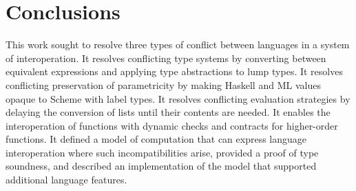 \chapter{Conclusions}

This work sought to resolve three types of conflict between languages in a system of interoperation.  It resolves conflicting type systems by converting between equivalent expressions and applying type abstractions to lump types.  It resolves conflicting preservation of parametricity by making Haskell and ML values opaque to Scheme with label types.  It resolves conflicting evaluation strategies by delaying the conversion of lists until their contents are needed.  It enables the interoperation of functions with dynamic checks and contracts for higher-order functions.  It defined a model of computation that can express language interoperation where such incompatibilities arise, provided a proof of type soundness, and described an implementation of the model that supported additional language features.
